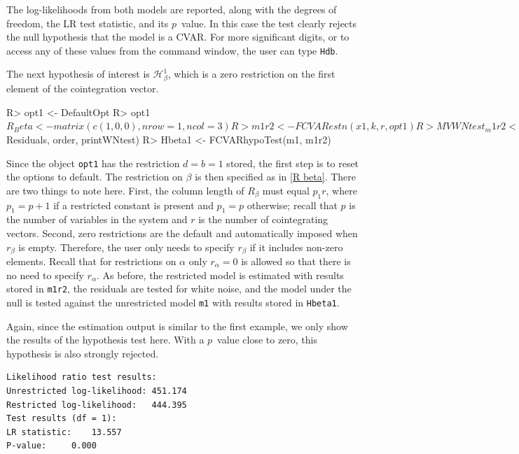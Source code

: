 \documentclass[article]{jss}
\begin{document}
The log-likelihoods from both models are reported, along with the degrees of freedom, the LR test statistic, and its $p$~value. In this case the test clearly rejects the null hypothesis that the model is a CVAR. For more significant digits, or to access any of these values from the command window, the user can type \verb|Hdb|.

The next hypothesis of interest is $\mathscr{H}_{\beta}^1$, which is a zero restriction on the first element of the cointegration vector.

\begin{Code}
R> opt1 <- DefaultOpt
R> opt1$R_Beta <- matrix(c(1, 0, 0), nrow = 1, ncol = 3)
R> m1r2 <- FCVARestn(x1, k, r, opt1)
R> MVWNtest_m1r2 <- MVWNtest(m1r2$Residuals, order, printWNtest)
R> Hbeta1 <- FCVARhypoTest(m1, m1r2)
\end{Code}

Since the object \verb|opt1| has the restriction $d=b=1$ stored, the first step is to reset the options to default. The restriction on $\beta$ is then specified as in \eqref{R beta}. There are two things to note here. First, the column length of $R_{\beta}$ must equal $p_1 r$, where $p_1=p+1$ if a restricted constant is present and $p_1=p$ otherwise; recall that $p$ is the number of variables in the system and $r$ is the number of cointegrating vectors. Second, zero restrictions are the default and automatically imposed when $r_{\beta}$ is empty. Therefore, the user only needs to specify $r_{\beta}$ if it includes non-zero elements. Recall that for restrictions on $\alpha$ only $r_\alpha = 0$ is allowed so that there is no need to specify $r_\alpha$. As before, the restricted model is estimated with results stored in \verb|m1r2|, the residuals are tested for white noise, and the model under the null is tested against the unrestricted model \verb|m1| with results stored in \verb|Hbeta1|.

Again, since the estimation output is similar to the first example, we only show the results of the hypothesis test here. With a $p$~value close to zero, this hypothesis is also strongly rejected.

\begin{verbatim}
Likelihood ratio test results:
Unrestricted log-likelihood: 451.174
Restricted log-likelihood:   444.395
Test results (df = 1):
LR statistic: 	 13.557
P-value: 	 0.000
\end{verbatim}
\end{document}
